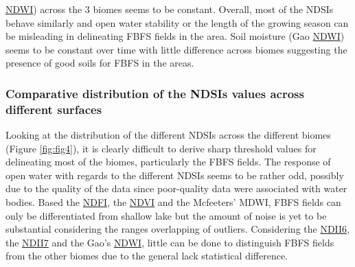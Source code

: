 \documentclass[12pt,oneside]{article}
\begin{document}
\href{https://en.wikipedia.org/wiki/Normalized_difference_water_index}{NDWI}) across the 3 biomes seems to be constant. Overall, most of the NDSIs behave similarly and open water stability or the length of the growing season can be misleading in delineating FBFS fields in the area. Soil moisture (Gao \href{https://en.wikipedia.org/wiki/Normalized_difference_water_index}{NDWI}) seems to be constant over time with little difference across biomes suggesting the presence of good soils for FBFS in the areas.

\hypertarget{II12}{%
\subsubsection{Comparative distribution of the NDSIs values across different surfaces}\label{II12}}

Looking at the distribution of the different NDSIs across the different biomes (Figure \ref{fig:fig4}), it is clearly difficult to derive sharp threshold values for delineating most of the biomes, particularly the FBFS fields. The response of open water with regards to the different NDSIs seems to be rather odd, possibly due to the quality of the data since poor-quality data were associated with water bodies. Based the \href{http://journals.plos.org/plosone/article/file?id=10.1371/journal.pone.0088741\&type=printable}{NDFI}, the \href{https://www.sciencedirect.com/science/article/pii/0034425779900130?via\%3Dihub}{NDVI} and the Mcfeeters' MDWI, FBFS fields can only be differentiated from shallow lake but the amount of noise is yet to be substantial considering the ranges overlapping of outliers. Considering the \href{https://www.sciencedirect.com/science/article/pii/0034425789900461?via\%3Dihub}{NDII6}, the \href{https://www.sciencedirect.com/science/article/pii/0034425789900461?via\%3Dihub}{NDII7} and the Gao's \href{https://en.wikipedia.org/wiki/Normalized_difference_water_index}{NDWI}, little can be done to distinguish FBFS fields from the other biomes due to the general lack statistical difference.
\end{document}
